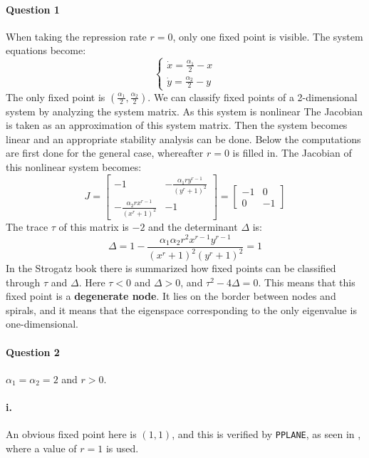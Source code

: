 \documentclass[a4paper,11pt]{article}
\begin{document}
\paragraph{Question 1}\: When taking the repression rate $r=0$, only one fixed point is visible. 
The system equations become:
\begin{equation*}
	\begin{cases}
		 \dot{x}=\frac{\alpha_1}{2}-x\\
		 \dot{y}=\frac{\alpha_2}{2}-y
	\end{cases}
\end{equation*}
The only fixed point is $\left(\frac{\alpha_1}{2}, \frac{\alpha_2}{2}\right)$. We can classify fixed points
of a 2-dimensional system by analyzing the system matrix. As this system is nonlinear The Jacobian is taken 
as an approximation of this system matrix. Then the system becomes linear and an appropriate stability analysis
can be done. Below the computations are first done for the general case, whereafter $r=0$ is filled in.
The Jacobian of this nonlinear system becomes:
\begin{equation*}
	J=
	\begin{bmatrix}
		-1 & -\frac{\alpha_1ry^{r-1}}{(y^r+1)^2}\\
		-\frac{\alpha_2rx^{r-1}}{(x^r+1)^2} & -1
	\end{bmatrix}=
	\begin{bmatrix}
		-1 & 0\\
		0 & -1
	\end{bmatrix}
\end{equation*}
The trace $\tau$ of this matrix is $-2$ and the determinant $\Delta$ is:
\begin{equation*}
	\Delta=1-\frac{\alpha_1\alpha_2r^2x^{r-1}y^{r-1}}{(x^r+1)^2(y^r+1)^2}=1
\end{equation*}
In the Strogatz book there is summarized how fixed points can be classified through
$\tau$ and $\Delta$. Here $\tau<0$ and $\Delta>0$, and $\tau^2-4\Delta=0$. This means that this fixed
point is a \textbf{degenerate node}. It lies on the border between nodes and spirals, and it means that the 
eigenspace corresponding to the only eigenvalue is one-dimensional.
\paragraph{Question 2}\: $\alpha_1=\alpha_2=2$ and $r>0$.
\vspace{-5	mm}
\paragraph{i.}\: An obvious fixed point here is $(1, 1)$, and this is verified by \texttt{PPLANE},
as seen in , where a value of $r=1$ is used. 
\vspace{-5mm}
\end{document}
